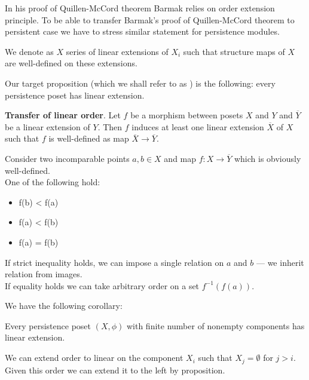 In his proof of Quillen-McCord theorem Barmak relies on order extension principle. To be able to transfer Barmak's proof of Quillen-McCord theorem to persistent case we have to stress similar statement for persistence modules.

\begin{definition}
  We denote as  $X$ series of linear extensions of $X_i$ such that structure maps of $X$ are well-defined on these extensions.
\end{definition}

Our target proposition (which we shall refer to as ) is the following: every persistence poset has linear extension.

\begin{proposition}
  \textbf{Transfer of linear order}. Let $f$ be a morphism between posets $X$ and $Y$ and $\overline{Y}$ be a linear extension of $Y$. Then $f$ induces at least one linear extension $\overline{X}$ of $X$ such that $f$ is well-defined as map $\overline{X} \to \overline{Y}$.
\end{proposition}

\begin{pf}
  Consider two incomparable points $a, b \in X$ and map $f : X \to \overline{Y}$ which is obviously well-defined.\\
  One of the following hold:\\
  \begin{itemize}
    \item f(b) < f(a)
    \item f(a) < f(b)
    \item f(a) = f(b)
  \end{itemize}
  If strict inequality holds, we can impose a single relation on $a$ and $b$ --- we inherit relation from images.\\
  If equality holds we can take arbitrary order on a set $f^{-1}(f(a))$.
\end{pf}

We have the following corollary:\\

\begin{proposition}
  Every persistence poset $(X,\phi)$ with finite number of nonempty components has linear extension.
\end{proposition}

\begin{pf}
  We can extend order to linear on the component $X_i$ such that $X_j = \emptyset$ for $j > i$. Given this order we can extend it to the left by proposition.
\end{pf}

